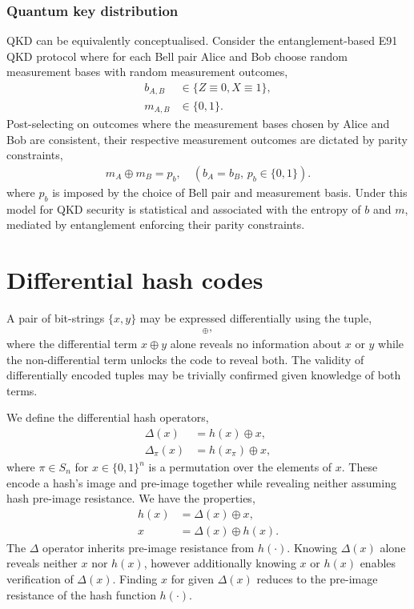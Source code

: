 \documentclass[twocolumn, aps, amsmath, amssymb, nofootinbib, superscriptaddress, longbibliography, doublefloatfix, table-of-contents, eqsecnum, rmp]{revtex4-2}
\begin{document}
\subsubsection{Quantum key distribution}

QKD can be equivalently conceptualised. Consider the entanglement-based E91 QKD protocol where for each Bell pair Alice and Bob choose random measurement bases with random measurement outcomes,
\begin{align}
	b_{A,B} &\in \{Z\equiv 0, X\equiv 1\},\nonumber\\
	m_{A,B} &\in \{0,1\}.
\end{align}
Post-selecting on outcomes where the measurement bases chosen by Alice and Bob are consistent, their respective measurement outcomes are dictated by parity constraints,
\begin{align}
	m_A\oplus m_B = p_b,\quad (b_A=b_B,\, p_b\in\{0,1\}).
\end{align}
where $p_b$ is imposed by the choice of Bell pair and measurement basis. Under this model for QKD security is statistical and associated with the entropy of $b$ and $m$, mediated by entanglement enforcing their parity constraints.

\section{Differential hash codes}

A pair of bit-strings $\{x,y\}$ may be expressed differentially using the tuple,
\begin{align}
	[x,x\oplus y]_\oplus,
\end{align}
where the differential term $x\oplus y$ alone reveals no information about $x$ or $y$ while the non-differential term unlocks the code to reveal both. The validity of differentially encoded tuples may be trivially confirmed given knowledge of both terms.

We define the differential hash operators,
\begin{align}
	\Delta(x) &= h(x)\oplus x,\nonumber\\
	\Delta_\pi(x) &= h(x_\pi)\oplus x,
\end{align}
where $\pi\in S_n$ for $x\in\{0,1\}^n$ is a permutation over the elements of $x$. These encode a hash's image and pre-image together while revealing neither assuming hash pre-image resistance. We have the properties,
\begin{align}
	h(x) &= \Delta(x) \oplus x,\nonumber\\
	x &= \Delta(x) \oplus h(x).
\end{align}
The $\Delta$ operator inherits pre-image resistance from $h(\cdot)$. Knowing $\Delta(x)$ alone reveals neither $x$ nor $h(x)$, however additionally knowing $x$ or $h(x)$ enables verification of $\Delta(x)$. Finding $x$ for given $\Delta(x)$ reduces to the pre-image resistance of the hash function $h(\cdot)$.
\end{document}
